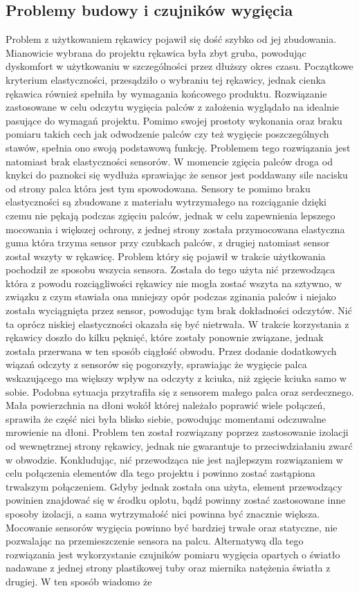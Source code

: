  \subsection{Problemy budowy i czujników wygięcia}
 \label{subsec:iuPalce}
 Problem z użytkowaniem rękawicy pojawił się dość szybko od jej zbudowania. Mianowicie wybrana do projektu rękawica była zbyt gruba, powodując dyskomfort w użytkowaniu w szczególności przez dłuższy okres czasu. Początkowe kryterium elastyczności, przesądziło o wybraniu tej rękawicy, jednak cienka rękawica również spełniła by wymagania końcowego produktu. Rozwiązanie zastosowane w celu odczytu wygięcia palców z założenia wyglądało na idealnie pasujące do wymagań projektu. Pomimo swojej prostoty wykonania oraz braku pomiaru takich cech jak odwodzenie palców czy też wygięcie poszczególnych stawów, spełnia ono swoją podstawową funkcję. Problemem tego rozwiązania jest natomiast brak elastyczności sensorów. W momencie zgięcia palców droga od knykci do paznokci się wydłuża sprawiając że sensor jest poddawany sile nacisku od strony palca która jest tym spowodowana. Sensory te pomimo braku elastyczności są zbudowane z materiału wytrzymałego na rozciąganie dzięki czemu nie pękają podczas zgięciu palców, jednak w celu zapewnienia lepszego mocowania i większej ochrony, z jednej strony została przymocowana elastyczna guma która trzyma sensor przy czubkach palców, z drugiej natomiast sensor został wszyty w rękawicę. Problem który się pojawił w trakcie użytkowania pochodził ze sposobu wszycia sensora. Została do tego użyta nić przewodząca która z powodu rozciągliwości rękawicy nie mogła zostać wszyta na sztywno, w związku z czym stawiała ona mniejszy opór podczas zginania palców i niejako została wyciągnięta przez sensor, powodując tym brak dokładności odczytów. Nić ta oprócz niskiej elastyczności okazała się być nietrwała. W trakcie korzystania z rękawicy doszło do kilku pęknięć, które zostały ponownie związane, jednak została przerwana w ten sposób ciągłość obwodu. Przez dodanie dodatkowych wiązań odczyty z sensorów się pogorszyły, sprawiając że wygięcie palca wskazującego ma większy wpływ na odczyty z kciuka, niż zgięcie kciuka samo w sobie. Podobna sytuacja przytrafiła się z sensorem małego palca oraz serdecznego. Mała powierzchnia na dłoni wokół której należało poprawić wiele połączeń, sprawiła że część nici była blisko siebie, powodując momentami odczuwalne mrowienie na dłoni. Problem ten został rozwiązany poprzez zastosowanie izolacji od wewnętrznej strony rękawicy, jednak nie gwarantuje to przeciwdziałaniu zwarć w obwodzie. Konkludując, nić przewodząca nie jest najlepszym rozwiązaniem w celu połączenia elementów dla tego projektu i powinno zostać zastąpiona trwalszym połączeniem. Gdyby jednak została ona użyta, element przewodzący powinien znajdować się w środku oplotu, bądź powinny zostać zastosowane inne sposoby izolacji, a sama wytrzymałość nici powinna być znacznie większa. Mocowanie sensorów wygięcia powinno być bardziej trwałe oraz statyczne, nie pozwalając na przemieszczenie sensora na palcu. Alternatywą dla tego rozwiązania jest wykorzystanie czujników pomiaru wygięcia opartych o światło nadawane z jednej strony plastikowej tuby oraz miernika natężenia światła z drugiej. W ten sposób wiadomo że 